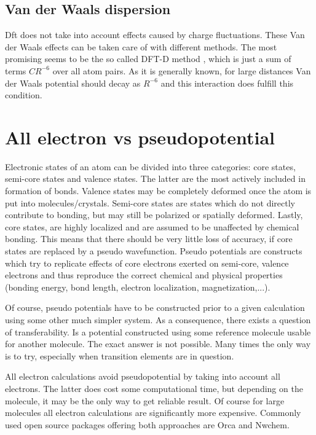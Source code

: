 \documentclass[openany, longbibliography,slovene,a4paper,12pt]{article}
\begin{document}
\subsection{Van der Waals dispersion}
Dft does not take into account effects caused by charge fluctuations. These Van
der Waals effects can be taken care of with different methods.
 The most promising seems to be the so called DFT-D method
\cite{consis_accur_ab_initio_param}, which is just a sum of terms $CR^{-6}$
over all atom pairs. As it is generally known, for large distances Van der Waals
potential should decay as $R^{-6}$ and this interaction does fulfill this condition.


\section{All electron vs pseudopotential}
Electronic states of an atom can be divided into three categories: core states,
semi-core states and valence states. The latter are the most actively included
in formation of bonds. Valence states may be completely deformed once the atom
is put into molecules/crystals. Semi-core states are states which do not
directly contribute to bonding, but may still be polarized or spatially
deformed. Lastly, core states, are highly localized and are assumed to be
unaffected by chemical bonding. This means that there should be very little loss
of accuracy, if core states are replaced by a pseudo wavefunction.
Pseudo potentials are constructs which try to
replicate effects of core electrons exerted on semi-core, valence electrons and
thus reproduce the correct chemical and physical properties (bonding energy, bond
length, electron localization, magnetization,...).

Of course, pseudo potentials have to be constructed prior to a given calculation using
some other much simpler system. As a consequence, there
exists a question of transferability. Is a potential constructed using some
reference molecule usable for another molecule. The exact answer is
not possible. Many times the only way is to try, especially when transition
elements are in question.

All electron calculations avoid pseudopotential by taking into account all
electrons. The latter does cost some computational time, but depending on the
molecule, it may be the only way to get reliable result. Of course for large
molecules all electron calculations are significantly more expensive.
Commonly used open source packages offering both approaches are Orca and Nwchem.
\end{document}
